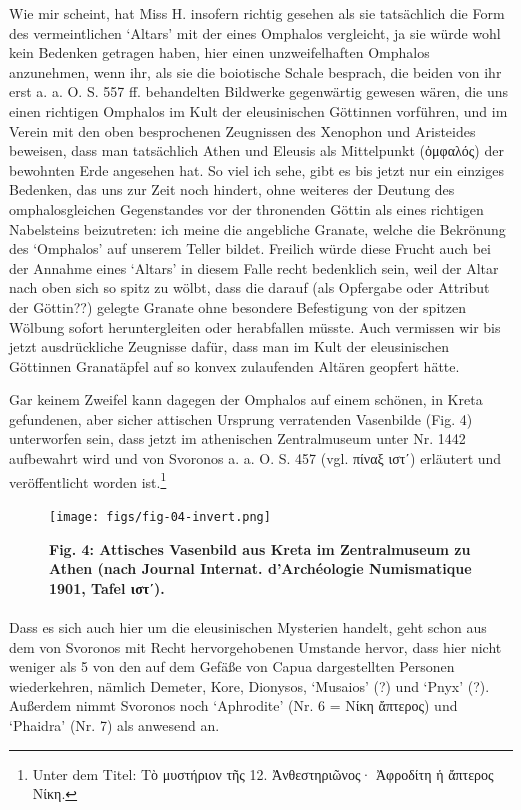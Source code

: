 \documentclass[a4paper, 11pt, oneside]{article}
\begin{document}
Wie mir scheint, hat Miss H. insofern richtig gesehen als sie tatsächlich die Form des vermeintlichen `Altars' mit der eines Omphalos vergleicht, ja sie würde wohl kein Bedenken getragen haben, hier einen unzweifelhaften Omphalos anzunehmen, wenn ihr, als sie die boiotische Schale besprach, die beiden von ihr erst a. a. O. S. 557 ff. behandelten Bildwerke gegenwärtig gewesen wären, die uns einen richtigen Omphalos im Kult der eleusinischen Göttinnen vorführen, und im Verein mit den oben besprochenen Zeugnissen des Xenophon und Aristeides beweisen, dass man tatsächlich Athen und Eleusis als Mittelpunkt (ὀμφαλός) der bewohnten Erde angesehen hat. So viel ich sehe, gibt es bis jetzt nur ein einziges Bedenken, das uns zur Zeit noch hindert, ohne weiteres der Deutung des omphalosgleichen Gegenstandes vor der thronenden Göttin als eines richtigen Nabelsteins beizutreten: ich meine die angebliche Granate, welche die Bekrönung des `Omphalos' auf unserem Teller bildet. Freilich würde diese Frucht auch bei der Annahme eines `Altars' in diesem Falle recht bedenklich sein, weil der Altar nach oben sich so spitz zu wölbt, dass die darauf (als Opfergabe oder Attribut der Göttin??) gelegte Granate ohne besondere Befestigung von der spitzen Wölbung sofort heruntergleiten oder herabfallen müsste. Auch vermissen wir bis jetzt ausdrückliche Zeugnisse dafür, dass man im Kult der eleusinischen Göttinnen Granatäpfel auf so konvex zulaufenden Altären geopfert hätte.

Gar keinem Zweifel kann dagegen der Omphalos auf einem schönen, in Kreta gefundenen, aber sicher attischen Ursprung verratenden Vasenbilde (Fig. 4) unterworfen sein, dass jetzt im athenischen Zentralmuseum unter Nr. 1442 aufbewahrt wird und von Svoronos a. a. O. S. 457 (vgl. πίναξ ιστʹ) erläutert und veröffentlicht worden ist.\footnote{Unter dem Titel: Τὸ μυστήριον τῆς 12. Ἀνθεστηριῶνος· Ἀφροδίτη ἡ ἄπτερος Νίκη.}

\begin{figure}[H]
\centering
\texttt{[image: figs/fig-04-invert.png]}
\caption{\bfseries Fig. 4: Attisches Vasenbild aus Kreta im Zentralmuseum zu Athen (nach Journal Internat. d'Archéologie Numismatique 1901, Tafel ιστʹ).}
\end{figure}
\paragraph{}
Dass es sich auch hier um die eleusinischen Mysterien handelt, geht schon aus dem von Svoronos mit Recht hervorgehobenen Umstande hervor, dass hier nicht weniger als 5 von den auf dem Gefäße von Capua dargestellten Personen wiederkehren, nämlich Demeter, Kore, Dionysos, `Musaios' (?) und `Pnyx' (?). Außerdem nimmt Svoronos noch `Aphrodite' (Nr. 6 = Νίκη ἄπτερος) und `Phaidra' (Nr. 7) als anwesend an.
\end{document}
